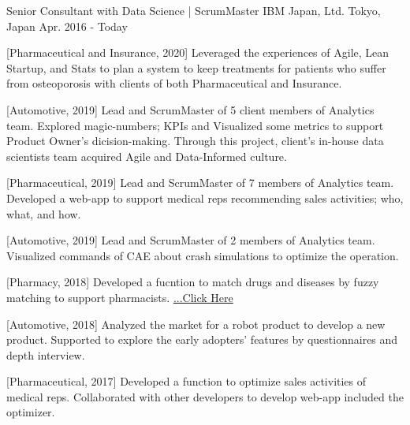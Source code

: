 

\begin{cventries}

  \cventry
    {Senior Consultant with Data Science | ScrumMaster} %
    {IBM Japan, Ltd.} %
    {Tokyo, Japan} %
    {Apr. 2016 - Today} %
    {
      \begin{cvitems} %
        \item {[Pharmaceutical and Insurance, 2020] Leveraged the experiences of Agile, Lean Startup, and Stats to plan a system to keep treatments for patients who suffer from osteoporosis with clients of both Pharmaceutical and Insurance.}
        \item {[Automotive, 2019] Lead and ScrumMaster of 5 client members of Analytics team. Explored magic-numbers; KPIs and Visualized some metrics to support Product Owner's dicision-making. Through this project, client's in-house data scientists team acquired Agile and Data-Informed culture.}
        \item {[Pharmaceutical, 2019] Lead and ScrumMaster of 7 members of Analytics team. Developed a web-app to support medical reps recommending sales activities; who, what, and how.}
        \item {[Automotive, 2019] Lead and ScrumMaster of 2 members of Analytics team. Visualized commands of CAE about crash simulations to optimize the operation.}
        \item {[Pharmacy, 2018] Developed a fucntion to match drugs and diseases by fuzzy matching to support pharmacists. \href{https://www.ibm.com/think/jp-ja/business/sakura-ai/}{...Click Here}}
        \item {[Automotive, 2018] Analyzed the market for a robot product to develop a new product. Supported to explore the early adopters' features by questionnaires and depth interview.}
        \item {[Pharmaceutical, 2017] Developed a function to optimize sales activities of medical reps. Collaborated with other developers to develop web-app included the optimizer.}

\end{cvitems}}
\end{cventries}
